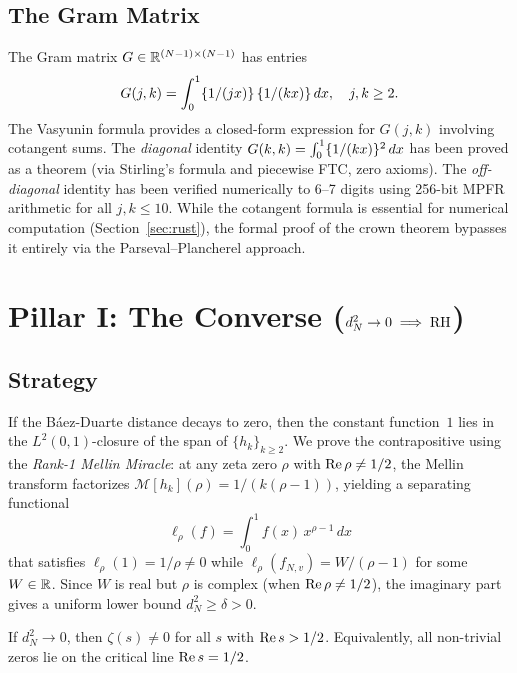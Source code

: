 \documentclass[11pt,a4paper]{article}
\begin{document}
\subsection{The Gram Matrix}

The Gram matrix $G \in \mathbb{R}^{(N-1) \times (N-1)}$ has entries
\[
  G(j,k) = \int_0^1 \{1/(jx)\}\,\{1/(kx)\}\,dx, \quad j,k \geq 2.
\]
The Vasyunin formula \cite{vasyunin1995} provides a closed-form expression
for $G(j,k)$ involving cotangent sums. The \emph{diagonal} identity
$G(k,k) = \int_0^1 \{1/(kx)\}^2\,dx$ has been proved as a theorem
(via Stirling's formula and piecewise FTC, zero axioms).
The \emph{off-diagonal} identity has been verified numerically to
6--7 digits using 256-bit MPFR arithmetic for all $j, k \leq 10$.
While the cotangent formula is essential for numerical computation
(Section~\ref{sec:rust}), the formal proof of the crown theorem
bypasses it entirely via the Parseval--Plancherel approach.

\section{Pillar I: The Converse ($d_N^2 \to 0 \implies \mathrm{RH}$)}

\subsection{Strategy}

If the B\'aez-Duarte distance decays to zero, then the constant function~$1$
lies in the $L^2(0,1)$-closure of the span of $\{h_k\}_{k \geq 2}$.
We prove the contrapositive using the \emph{Rank-1 Mellin Miracle}: at any
zeta zero $\rho$ with $\operatorname{Re}\rho \neq 1/2$, the Mellin transform factorizes
$\mathcal{M}[h_k](\rho) = 1/(k(\rho-1))$, yielding a separating functional
\[
  \ell_\rho(f) = \int_0^1 f(x)\,x^{\rho-1}\,dx
\]
that satisfies $\ell_\rho(1) = 1/\rho \neq 0$ while
$\ell_\rho(f_{N,v}) = W/(\rho-1)$ for some $W \in \mathbb{R}$. Since $W$ is
real but $\rho$ is complex (when $\operatorname{Re}\rho \neq 1/2$), the imaginary part
gives a uniform lower bound $d_N^2 \geq \delta > 0$.

\begin{theorem}
\label{thm:converse}
If $d_N^2 \to 0$, then $\zeta(s) \neq 0$ for all $s$ with $\operatorname{Re} s > 1/2$.
Equivalently, all non-trivial zeros lie on the critical line $\operatorname{Re} s = 1/2$.
\end{theorem}
\end{document}
